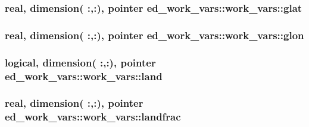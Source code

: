 \subsubsection[{\texorpdfstring{glat}{glat}}]{\setlength{\rightskip}{0pt plus 5cm}real, dimension(  \+:,\+:), pointer ed\+\_\+work\+\_\+vars\+::work\+\_\+vars\+::glat}\hypertarget{structed__work__vars_1_1work__vars_a5ecb409e79dce91a912a091c1e52c86f}{}\label{structed__work__vars_1_1work__vars_a5ecb409e79dce91a912a091c1e52c86f}
\subsubsection[{\texorpdfstring{glon}{glon}}]{\setlength{\rightskip}{0pt plus 5cm}real, dimension(  \+:,\+:), pointer ed\+\_\+work\+\_\+vars\+::work\+\_\+vars\+::glon}\hypertarget{structed__work__vars_1_1work__vars_a261b9c78feb96aa1ae5e2c7f3c05a14f}{}\label{structed__work__vars_1_1work__vars_a261b9c78feb96aa1ae5e2c7f3c05a14f}
\subsubsection[{\texorpdfstring{land}{land}}]{\setlength{\rightskip}{0pt plus 5cm}logical, dimension(  \+:,\+:), pointer ed\+\_\+work\+\_\+vars\+::work\+\_\+vars\+::land}\hypertarget{structed__work__vars_1_1work__vars_a8fd4a40ea2044b6bcd7d1f6d9889eb7e}{}\label{structed__work__vars_1_1work__vars_a8fd4a40ea2044b6bcd7d1f6d9889eb7e}
\subsubsection[{\texorpdfstring{landfrac}{landfrac}}]{\setlength{\rightskip}{0pt plus 5cm}real, dimension(  \+:,\+:), pointer ed\+\_\+work\+\_\+vars\+::work\+\_\+vars\+::landfrac}\hypertarget{structed__work__vars_1_1work__vars_ab8f96bf658cca93060e2873175b5e01d}{}\label{structed__work__vars_1_1work__vars_ab8f96bf658cca93060e2873175b5e01d}
